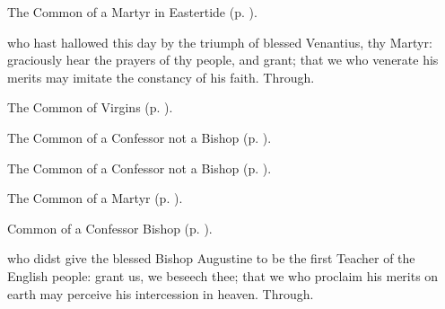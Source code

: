 \begin{rubric}
	The Common of a Martyr in Eastertide (p. \pageref{CommonMartyrEaster}).
\end{rubric}

{} who hast hallowed this day by the triumph of blessed Venantius, thy Martyr: graciously hear the prayers of thy people, and grant; that we who venerate his merits may imitate the constancy of his faith. Through.




\begin{rubric}
	The Common of Virgins (p. \pageref{VirginOnlyCollect}).
\end{rubric}



\begin{rubric}
	The Common of a Confessor not a Bishop (p. \pageref{AbbotCollect}).
\end{rubric}



\begin{rubric}
	The Common of a Confessor not a Bishop (p. \pageref{ConfessorNotBishopCollect}).
\end{rubric}



\begin{rubric}
	The Common of a Martyr (p. \pageref{CommonMartyrBishopEasterCollect}).
\end{rubric}



\begin{rubric}
	Common of a Confessor Bishop (p. \pageref{CommonConfessorBishop}).
\end{rubric}

{} who didst give the blessed Bishop Augustine to be the first Teacher of the English people: grant us, we beseech thee; that we who proclaim his merits on earth may perceive his intercession in heaven. Through.

